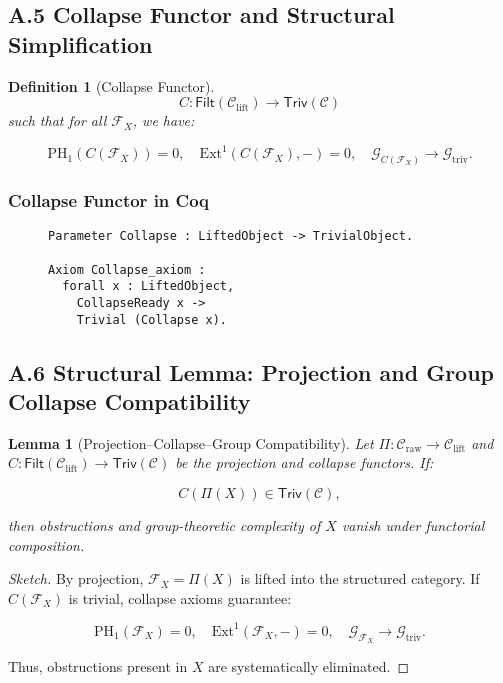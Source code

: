 \documentclass[11pt]{article}
\newtheorem{definition}[theorem]{Definition}
\newtheorem{lemma}[theorem]{Lemma}
\begin{document}
\subsection*{A.5 Collapse Functor and Structural Simplification}

\begin{definition}[Collapse Functor]
\[
C : \mathsf{Filt}(\mathcal{C}_{\mathrm{lift}}) \longrightarrow \mathsf{Triv}(\mathcal{C})
\]
such that for all \( \mathcal{F}_X \), we have:

\[
\mathrm{PH}_1(C(\mathcal{F}_X)) = 0, \quad \mathrm{Ext}^1(C(\mathcal{F}_X), -) = 0, \quad \mathcal{G}_{C(\mathcal{F}_X)} \longrightarrow \mathcal{G}_{\mathrm{triv}}.
\]
\end{definition}


\subsubsection*{Collapse Functor in Coq}

\begin{figure}[h]
\centering
\begin{lstlisting}[language=Coq, caption=Collapse Functor Axiom]
Parameter Collapse : LiftedObject -> TrivialObject.

Axiom Collapse_axiom :
  forall x : LiftedObject,
    CollapseReady x ->
    Trivial (Collapse x).
\end{lstlisting}
\end{figure}

\subsection*{A.6 Structural Lemma: Projection and Group Collapse Compatibility}

\begin{lemma}[Projection–Collapse–Group Compatibility]
Let \( \Pi: \mathcal{C}_{\mathrm{raw}} \to \mathcal{C}_{\mathrm{lift}} \) and \( C: \mathsf{Filt}(\mathcal{C}_{\mathrm{lift}}) \to \mathsf{Triv}(\mathcal{C}) \) be the projection and collapse functors. If:

\[
C(\Pi(X)) \in \mathsf{Triv}(\mathcal{C}),
\]

then obstructions and group-theoretic complexity of \( X \) vanish under functorial composition.

\end{lemma}

\begin{proof}[Sketch]
By projection, \( \mathcal{F}_X = \Pi(X) \) is lifted into the structured category. If \( C(\mathcal{F}_X) \) is trivial, collapse axioms guarantee:

\[
\mathrm{PH}_1(\mathcal{F}_X) = 0, \quad \mathrm{Ext}^1(\mathcal{F}_X, -) = 0, \quad \mathcal{G}_{\mathcal{F}_X} \longrightarrow \mathcal{G}_{\mathrm{triv}}.
\]

Thus, obstructions present in \( X \) are systematically eliminated.
\end{proof}
\end{document}
